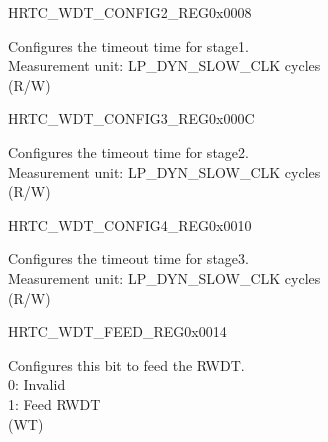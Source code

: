 \begin{register}{H}{RTC\_WDT\_CONFIG2\_REG}{0x0008}\label{regdesc:RTCWDTCONFIG2REG}
%
\regnewline%
\begin{regdesc}\begin{reglist}
\label{fielddesc:RTCWDTSTG1HOLD}\item [RTC\_WDT\_STG1\_HOLD] Configures the timeout time for stage1.\\
Measurement unit: LP\_DYN\_SLOW\_CLK cycles \\ (R/W)
\end{reglist}\end{regdesc}
\end{register}


\begin{register}{H}{RTC\_WDT\_CONFIG3\_REG}{0x000C}\label{regdesc:RTCWDTCONFIG3REG}
%
\regnewline%
\begin{regdesc}\begin{reglist}
\label{fielddesc:RTCWDTSTG2HOLD}\item [RTC\_WDT\_STG2\_HOLD] Configures the timeout time for stage2.\\
Measurement unit: LP\_DYN\_SLOW\_CLK cycles \\ (R/W)
\end{reglist}\end{regdesc}
\end{register}


\begin{register}{H}{RTC\_WDT\_CONFIG4\_REG}{0x0010}\label{regdesc:RTCWDTCONFIG4REG}
%
\regnewline%
\begin{regdesc}\begin{reglist}
\label{fielddesc:RTCWDTSTG3HOLD}\item [RTC\_WDT\_STG3\_HOLD] Configures the timeout time for stage3.\\
Measurement unit: LP\_DYN\_SLOW\_CLK cycles  \\ (R/W)
\end{reglist}\end{regdesc}
\end{register}


\begin{register}{H}{RTC\_WDT\_FEED\_REG}{0x0014}\label{regdesc:RTCWDTFEEDREG}
%
%
\regnewline%
\begin{regdesc}\begin{reglist}
\label{fielddesc:RTCWDTFEED}\item [RTC\_WDT\_FEED] Configures this bit to feed the RWDT.\\
0: Invalid \\
1: Feed RWDT  \\ (WT)
\end{reglist}\end{regdesc}
\end{register}



